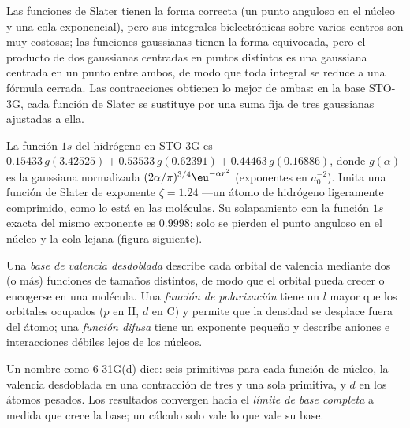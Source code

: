 Las funciones de Slater tienen la forma correcta (un punto anguloso en el núcleo y una
cola exponencial), pero sus integrales bielectrónicas sobre varios centros son
muy costosas; las funciones gaussianas tienen la forma equivocada, pero el producto de dos
gaussianas centradas en puntos distintos es una gaussiana centrada en un punto entre ambos, de modo que
toda integral se reduce a una fórmula cerrada. Las contracciones obtienen lo mejor de
ambas: en la base STO-3G, cada función de Slater se sustituye por una suma fija de
tres gaussianas ajustadas a ella.

\begin{example}\label{ex:b3:computational-chemistry:sto3g}
La función $1s$ del hidrógeno en STO-3G es $0.15433\,g(3.42525) + 0.53533\,
g(0.62391) + 0.44463\,g(0.16886)$, donde $g(\alpha)$ es la gaussiana normalizada
$(2\alpha/\pi)^{3/4}\eu^{-\alpha r^2}$ (exponentes en $a_0^{-2}$). Imita una
función de Slater de exponente $\zeta = 1.24$ ---un átomo de hidrógeno ligeramente
comprimido, como lo está en las moléculas. Su solapamiento con la función $1s$ exacta
del mismo exponente es $0.9998$; solo se pierden el punto anguloso en el núcleo y la
cola lejana (figura siguiente).
\end{example}

\begin{definition}\label{def:b3:computational-chemistry:split-valence}
Una \emph{base de valencia desdoblada} describe cada
orbital de valencia mediante dos (o más) funciones de tamaños distintos, de modo que el
orbital pueda crecer o encogerse en una molécula. Una \emph{función de
polarización} tiene un $l$ mayor que los orbitales
ocupados ($p$ en H, $d$ en C) y permite que la densidad se desplace fuera del átomo; una
\emph{función difusa} tiene un exponente pequeño y
describe aniones e interacciones débiles lejos de los núcleos.
\end{definition}

Un nombre como 6-31G(d) dice: seis primitivas para cada función de núcleo,
la valencia desdoblada en una contracción de tres y una sola primitiva, y 
$d$ en los átomos pesados. Los resultados convergen hacia el
\emph{límite de base completa} a medida que crece la base; un cálculo solo vale lo que
vale su base.

